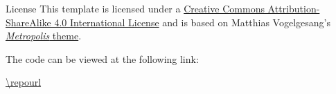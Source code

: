 
\begin{frame}{License}
    This template is licensed under a \href{https://creativecommons.org/licenses/by-sa/4.0/}{Creative Commons Attribution-ShareAlike 4.0 International License}
    and is based on Matthias Vogelgesang's \href{https://github.com/matze/mtheme}{\emph{Metropolis} theme}. \ccbysa

    The code can be viewed at the following link:

    \url{\repourl}
\end{frame}
